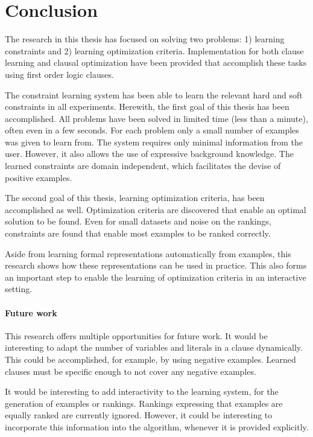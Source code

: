\documentclass{llncs}
\begin{document}
\section{Conclusion}
The research in this thesis has focused on solving two problems: 1) learning constraints and 2) learning optimization criteria.
Implementation for both clause learning and clausal optimization have been provided that accomplish these tasks using first order logic clauses.

The constraint learning system has been able to learn the relevant hard and soft constraints in all experiments.
Herewith, the first goal of this thesis has been accomplished.
All problems have been solved in limited time (less than a minute), often even in a few seconds.
For each problem only a small number of examples was given to learn from.
The system requires only minimal information from the user.
However, it also allows the use of expressive background knowledge.
The learned constraints are domain independent, which facilitates the devise of positive examples.

The second goal of this thesis, learning optimization criteria, has been accomplished as well.
Optimization criteria are discovered that enable an optimal solution to be found.
Even for small datasets and noise on the rankings, constraints are found that enable most examples to be ranked correctly.

Aside from learning formal representations automatically from examples, this research shows how these representations can be used in practice.
This also forms an important step to enable the learning of optimization criteria in an interactive setting.

\paragraph{Future work}
This research offers multiple opportunities for future work.
It would be interesting to adapt the number of variables and literals in a clause dynamically.
This could be accomplished, for example, by using negative examples.
Learned clauses must be specific enough to not cover any negative examples. 

It would be interesting to add interactivity to the learning system, for the generation of examples or rankings.
Rankings expressing that examples are equally ranked are currently ignored.
However, it could be interesting to incorporate this information into the algorithm, whenever it is provided explicitly.
\end{document}
